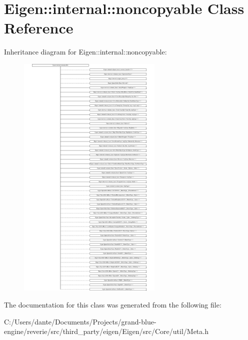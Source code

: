 \hypertarget{class_eigen_1_1internal_1_1noncopyable}{}\section{Eigen\+::internal\+::noncopyable Class Reference}
\label{class_eigen_1_1internal_1_1noncopyable}
Inheritance diagram for Eigen\+::internal\+::noncopyable\+:\begin{figure}[H]
\begin{center}
\leavevmode
\includegraphics[height=12.000000cm]{class_eigen_1_1internal_1_1noncopyable}
\end{center}
\end{figure}


The documentation for this class was generated from the following file\+:\begin{DoxyCompactItemize}
\item 
C\+:/\+Users/dante/\+Documents/\+Projects/grand-\/blue-\/engine/reverie/src/third\+\_\+party/eigen/\+Eigen/src/\+Core/util/Meta.\+h\end{DoxyCompactItemize}

